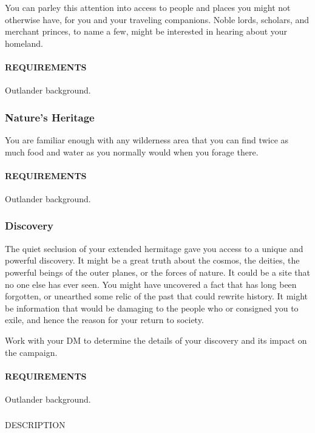     You can parley this attention into access to people and places you might not otherwise have, for you and your traveling companions.
    Noble lords, scholars, and merchant princes, to name a few, might be interested in hearing about your homeland.
    \paragraph{REQUIREMENTS} Outlander background.

    \subsubsection{Nature's Heritage} \label{feat::naturesheritage}
    You are familiar enough with any wilderness area that you can find twice as much food and water as you normally would when you forage there.
    \paragraph{REQUIREMENTS} Outlander background.

    \subsubsection{Discovery} \label{feat::discovery} %
    The quiet seclusion of your extended hermitage gave you access to a unique and powerful discovery.
    It might be a great truth about the cosmos, the deities, the powerful beings of the outer planes, or the forces of nature.
    It could be a site that no one else has ever seen.
    You might have uncovered a fact that has long been forgotten, or unearthed some relic of the past that could rewrite history.
    It might be information that would be damaging to the people who or consigned you to exile, and hence the reason for your return to society.

    Work with your DM to determine the details of your discovery and its impact on the campaign.
    \paragraph{REQUIREMENTS} Outlander background.

    \subsubsection{} \label{feat::NAME}
    DESCRIPTION

